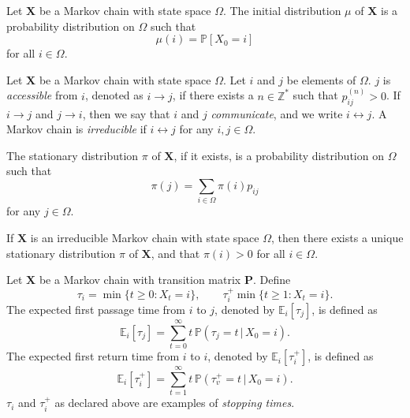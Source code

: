 \begin{definition}
  \label{def:5}
  Let $\mathbf{X}$ be a Markov chain with state space
  $\Omega$. The initial distribution $\mu$ of $\mathbf{X}$ is a probability
  distribution on $\Omega$ such that 
  \begin{equation}
    \label{eq:14}
    \mu(i) = \mathbb{P}[X_0 = i]
  \end{equation}
  for all $i \in \Omega$. 
\end{definition}

\begin{definition}
  \label{def:7}
  Let $\mathbf{X}$ be a Markov chain with state space $\Omega$. Let
  $i$ and $j$ be elements of $\Omega$. $j$ is
  {\em accessible} from $i$, denoted as $i \rightarrow j$, if there
  exists a $n \in \mathbb{Z}^{*}$ such that $p_{ij}^{(n)} > 0$. If $i
  \rightarrow j$ and $j \rightarrow i$, then we say that $i$ and $j$
  {\em communicate}, and we write $i \leftrightarrow j$. A Markov chain is
  {\em irreducible} if $i \leftrightarrow j$ for any $i,j \in \Omega$.
\end{definition}
\begin{definition}
  \label{def:2}
  The stationary distribution $\pi$ of
  $\mathbf{X}$, if it exists, is a probability distribution on
  $\Omega$ such that
  \begin{equation}
    \label{eq:15}
    \pi(j) = \sum_{i \in \Omega}{\pi(i) p_{ij}}
  \end{equation}
  for any $j \in \Omega$. 
\end{definition}

\begin{proposition}
  \label{prop:3}
  If $\mathbf{X}$ is an irreducible Markov chain with state space
  $\Omega$, then there exists a unique stationary distribution $\pi$
  of $\mathbf{X}$, and that $\pi(i) > 0$ for all $i \in \Omega$. 
\end{proposition}

\begin{definition}
  \label{def:3}
  Let $\mathbf{X}$ be a Markov chain
  with transition matrix $\mathbf{P}$. Define 
  \begin{equation}
    \label{eq:5}
    \tau_i = \min\{ t \geq 0 \colon X_t = i \}, \qquad \tau_i^{+} \min
    \{ t \geq 1 \colon X_t = i \}.
  \end{equation}
  The expected first passage time from $i$ to $j$, denoted by
  $\mathbb{E}_{i}[\tau_j]$, is defined as
  \begin{equation}
    \label{eq:6}
    \mathbb{E}_{i}[\tau_j] = \sum_{t = 0}^{\infty}{t \, \mathbb{P}(\tau_j =
      t \,|\, X_0 = i)}.
  \end{equation}
  The expected first return time from $i$ to $i$, denoted by
  $\mathbb{E}_{i}[\tau_i^{+}]$, is defined as
  \begin{equation}
    \label{eq:7}
    \mathbb{E}_{i}[\tau_i^{+}] = \sum_{t = 1}^{\infty}{t \,
      \mathbb{P}(\tau_v^{+} = t \,|\, X_0 = i)}.
  \end{equation}
  $\tau_i$ and $\tau_{i}^{+}$ as declared above are examples of {\em
    stopping times}. 
\end{definition}

